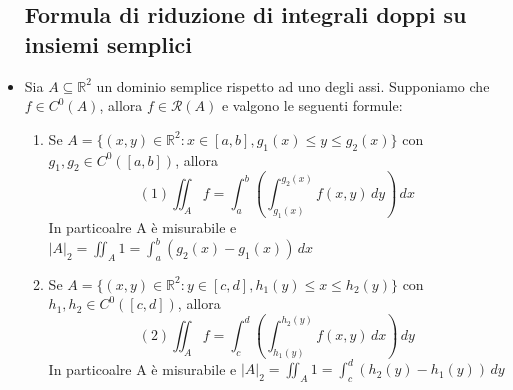 \documentclass{report}
\newcommand{\ace}{\`e }
\newcommand{\Ins}[1]{\mathbb{#1}}
\newcommand{\R}{\Ins{R}}
\newcommand{\abs}[1]{\left\lvert #1 \right\rvert}
\newcommand{\Rcal}{\mathcal{R}}
\begin{document}
\begin{itemize}
  \subsection{Formula di riduzione di integrali doppi su insiemi semplici}
  \item Sia $A\subseteq\R^2$ un dominio semplice rispetto ad uno degli assi. Supponiamo che $f\in C^{0}(A)$, allora 
        $f\in\Rcal(A)$ e valgono le seguenti formule:
        \begin{enumerate}
          \item Se $A = \{(x,y)\in\R^2 : x \in [a,b], g_1(x) \leq y \leq g_2(x)\}$ con $g_1, g_2 \in C^0([a,b])$, allora 
                $$(1) \iint_{A} f = \int_{a}^{b} \left(\int_{g_1(x)}^{g_2(x)} f(x,y) \, dy\right) \, dx$$
                In particoalre A \ace misurabile e $\abs{A}_2 = \iint_{A} 1 = \int_{a}^{b} \left(g_2(x)-g_1(x)\right) \, dx$
          \item Se $A = \{(x,y)\in\R^2 : y \in [c,d], h_1(y) \leq x \leq h_2(y)\}$ con $h_1, h_2 \in C^0([c,d])$, allora 
                $$(2) \iint_{A} f = \int_{c}^{d} \left(\int_{h_1(y)}^{h_2(y)} f(x,y) \, dx\right) \, dy$$
                In particoalre A \ace misurabile e $\abs{A}_2 = \iint_{A} 1 = \int_{c}^{d} \left(h_2(y)-h_1(y)\right) \, dy$
        \end{enumerate}
  

\end{itemize}
\end{document}
